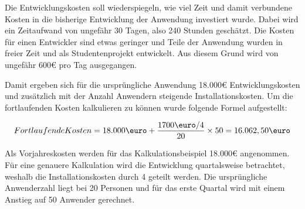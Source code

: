 Die Entwicklungskosten soll wiederspiegeln, wie viel Zeit und damit verbundene Kosten in die bisherige Entwicklung der Anwendung investiert wurde. Dabei wird ein Zeitaufwand von ungefähr 30 Tagen, also 240 Stunden geschätzt. Die Kosten für einen Entwickler sind etwas geringer und Teile der Anwendung wurden in freier Zeit und als Studentenprojekt entwickelt. Aus diesem Grund wird von ungefähr 600€ pro Tag ausgegangen.

Damit ergeben sich für die ursprüngliche Anwendung 18.000€ Entwicklungskosten und zusätzlich mit der Anzahl Anwendern steigende Installationskosten. Um die fortlaufenden Kosten kalkulieren zu können wurde folgende Formel aufgestellt:

\begin{align}
    Fortlaufende Kosten = 18.000\mbox{\euro} + \frac{1700\mbox{\euro}/4}{20} \times 50 = 16.062,50\mbox{\euro}
\end{align}

Als Vorjahreskosten werden für das Kalkulationsbeispiel 18.000€ angenommen. Für eine genauere Kalkulation wird die Entwicklung quartalsweise betrachtet, weshalb die Installationskosten durch 4 geteilt werden. Die ursprüngliche Anwenderzahl liegt bei 20 Personen und für das erste Quartal wird mit einem Anstieg auf 50 Anwender gerechnet.
\pagebreak






